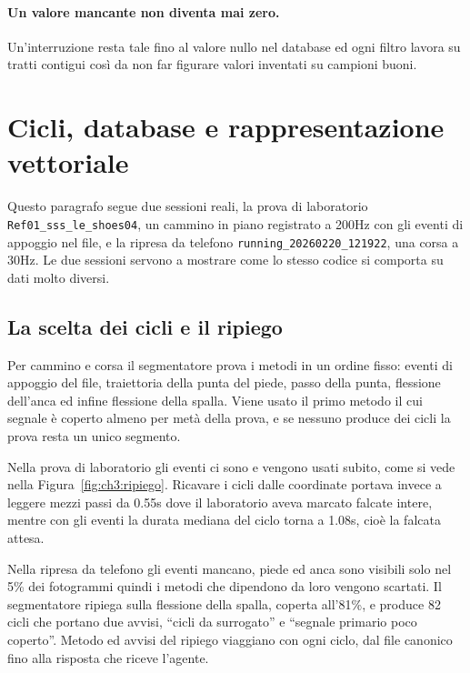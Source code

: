 \paragraph{Un valore mancante non diventa mai zero.} Un'interruzione resta tale
fino al valore nullo nel database ed ogni filtro lavora su tratti contigui così
da non far figurare valori inventati su campioni buoni.

\section{Cicli, database e rappresentazione vettoriale}
\label{sec:ch3:cicli}

Questo paragrafo segue due sessioni reali, la prova di laboratorio
\texttt{Ref01\_sss\_le\_shoes04}, un cammino in piano registrato a 200Hz con gli
eventi di appoggio nel file, e la ripresa da telefono
\texttt{running\_20260220\_121922}, una corsa a 30Hz. Le due sessioni servono a
mostrare come lo stesso codice si comporta su dati molto diversi.

\subsection{La scelta dei cicli e il ripiego}
\label{subsec:ch3:ripiego}

Per cammino e corsa il segmentatore prova i metodi in un ordine fisso:
eventi di appoggio del file, traiettoria della punta del piede, passo della punta,
flessione dell'anca ed infine flessione della spalla. Viene usato il primo metodo
il cui segnale è coperto almeno per metà della prova, e se nessuno produce dei
cicli la prova resta un unico segmento.

Nella prova di laboratorio gli eventi ci sono e vengono usati subito, come si vede
nella Figura~\ref{fig:ch3:ripiego}. Ricavare i cicli dalle coordinate portava
invece a leggere mezzi passi da 0.55s dove il laboratorio aveva marcato falcate
intere, mentre con gli eventi la durata mediana del ciclo torna a 1.08s, cioè la
falcata attesa.

Nella ripresa da telefono gli eventi mancano, piede ed anca sono visibili solo
nel 5\% dei fotogrammi quindi i metodi che dipendono da loro vengono scartati. Il
segmentatore ripiega sulla flessione della spalla, coperta all'81\%, e produce 82
cicli che portano due avvisi, ``cicli da surrogato'' e ``segnale primario poco
coperto''. Metodo ed avvisi del ripiego viaggiano con ogni ciclo, dal file
canonico fino alla risposta che riceve l'agente.

